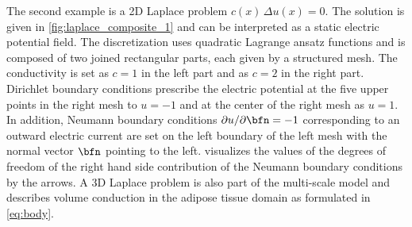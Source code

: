 The second example is a 2D Laplace problem $c(x)\,\Delta u(x) = 0$. The solution is given in \cref{fig:laplace_composite_1} and can be interpreted as a static electric potential field. 
The discretization uses quadratic Lagrange ansatz functions and is composed of two joined rectangular parts, each given by a structured mesh. The conductivity is set as $c=1$ in the left part and as $c=2$ in the right part. Dirichlet boundary conditions prescribe the electric potential at the five upper points in the right mesh to $u = -1$ and at the center of the right mesh as $u=1$. In addition, Neumann boundary conditions $\partial u / \partial \bfn = -1$ corresponding to an outward electric current are set on the left boundary of the left mesh with the normal vector $\bfn$ pointing to the left.  visualizes the values of the degrees of freedom of the right hand side contribution of the Neumann boundary conditions by the arrows. 
A 3D Laplace problem is also part of the multi-scale model and describes volume conduction in the adipose tissue domain as formulated in \cref{eq:body}.

